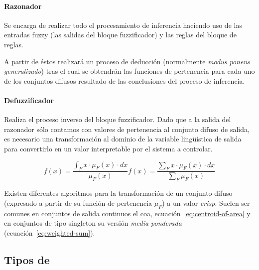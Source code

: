 \paragraph{Razonador}

Se encarga de realizar todo el procesamiento de inferencia haciendo uso de las entradas fuzzy (las salidas del bloque fuzzificador) y las reglas del bloque de reglas.

A partir de éstos realizará un proceso de deducción (normalmente \textit{modus ponens generalizado}) tras el cual se obtendrán las funciones de pertenencia para cada uno de los conjuntos difusos resultado de las conclusiones del proceso de inferencia.

\paragraph{Defuzzificador}

Realiza el proceso inverso del bloque fuzzificador. Dado que a la salida del razonador sólo contamos con valores de pertenencia al conjunto difuso de salida, es necesario una transformación al dominio de la variable lingüística de salida para convertirlo en un valor interpretable por el sistema a controlar.

\begin{subequations}
	\begin{equation}
		f(x) = \frac{\int_{F} x \cdot \mu_F(x) \cdot dx}{\mu_F(x)}
		\label{eq:centroid-of-area}
	\end{equation}
	\begin{equation}
		f(x) = \frac{\sum_{F} x \cdot \mu_F(x) \cdot dx}{\sum_{F} \mu_F(x)}
		\label{eq:weighted-sum}
	\end{equation}
\end{subequations}

Existen diferentes algoritmos para la transformación de un conjunto difuso (expresado a partir de su función de pertenencia $\mu_F$) a un valor \textit{crisp}. Suelen ser comunes en conjuntos de salida continuos el \Acrfull{coa}, ecuación~\ref{eq:centroid-of-area} y en conjuntos de tipo singleton su versión \textit{media ponderada} (ecuación~\ref{eq:weighted-sum}).

\subsection{Tipos de }

